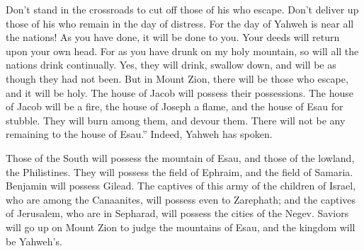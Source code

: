 {Don’t stand in the crossroads to cut off those of his who escape. Don’t deliver up those of his who remain in the day of distress.
For the day of Yahweh is near all the nations! As you have done, it will be done to you. Your deeds will return upon your own head.
For as you have drunk on my holy mountain, so will all the nations drink continually. Yes, they will drink, swallow down, and will be as though they had not been.
But in Mount Zion, there will be those who escape, and it will be holy. The house of Jacob will possess their possessions.
The house of Jacob will be a fire, the house of Joseph a flame, and the house of Esau for stubble. They will burn among them, and devour them. There will not be any remaining to the house of Esau.” Indeed, Yahweh has spoken.
\par }{\PP {}Those of the South will possess the mountain of Esau, and those of the lowland, the Philistines. They will possess the field of Ephraim, and the field of Samaria. Benjamin will possess Gilead.
The captives of this army of the children of Israel, who are among the Canaanites, will possess even to Zarephath; and the captives of Jerusalem, who are in Sepharad, will possess the cities of the Negev.
Saviors will go up on Mount Zion to judge the mountains of Esau, and the kingdom will be Yahweh’s.
\par }